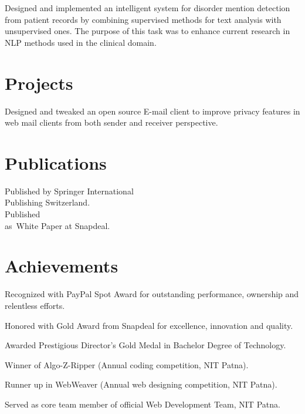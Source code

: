 \documentclass[]{rajnikant-resume-openfont}
\begin{document}
\begin{minipage}[t]{0.66\textwidth}
\begin{tightemize}
\item  {} Designed and implemented an intelligent system for disorder mention detection from
patient records by combining supervised methods for text analysis with unsupervised ones. The purpose of this
task was to enhance current research in NLP methods used in the clinical domain.
\end{tightemize}


\section{Projects}
Designed and tweaked an open source E-mail client to improve privacy features in web mail clients from both sender and receiver perspective.
\sectionsep


\section{Publications}
\textbullet{}  \href{https://rd.springer.com/chapter/10.1007/978-3-319-32467-8_118}{ } Published by Springer International \\ \hspace{9pt}Publishing Switzerland. \\
\textbullet{}   Published \\ \hspace{8pt} as White Paper at Snapdeal.
\sectionsep


\section{Achievements} 
\sectionsep
\begin{tightemize}
	\item Recognized with PayPal Spot Award for outstanding performance, ownership and relentless efforts.
	\item Honored with Gold Award from Snapdeal for excellence, innovation and quality.
	\item Awarded Prestigious Director's Gold Medal in Bachelor Degree of Technology.
	\item Winner of Algo-Z-Ripper (Annual coding competition, NIT Patna).
	\item Runner up in WebWeaver (Annual web designing competition, NIT Patna).
	\item Served as core team member of official Web Development Team, NIT Patna.
	

\end{tightemize}
\end{minipage}
\end{document}
